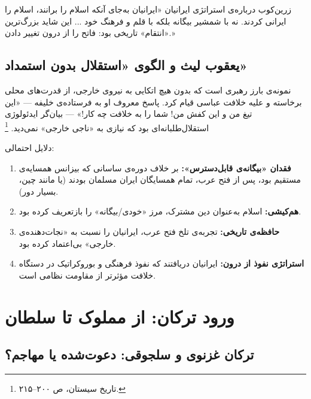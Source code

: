 \begin{histQuote}{زرین‌کوب درباره‌ی استراتژی ایرانیان}
«ایرانیان به‌جای آنکه اسلام را برانند، اسلام را ایرانی کردند. نه با شمشیر بیگانه بلکه با قلم و فرهنگ خود ... این شاید بزرگ‌ترین «انتقام» تاریخی بود: فاتح را از درون تغییر دادن.»
\end{histQuote}

\subsection{یعقوب لیث و الگوی «استقلال بدون استمداد»}
\label{subsec:ch05-yaqub}

 نمونه‌ی بارز رهبری است که بدون هیچ اتکایی به نیروی خارجی، از قدرت‌های محلی برخاسته و علیه خلافت عباسی قیام کرد. پاسخ معروف او به فرستاده‌ی خلیفه — «این تیغ من و این کفش من! شما را به خلافت چه کار!» — بیان‌گر ایدئولوژی استقلال‌طلبانه‌ای بود که نیازی به «ناجی خارجی» نمی‌دید.%
\footnote{تاریخ سیستان، ص ۲۰۰--۲۱۵.}

\begin{tcolorbox}[defbox, title={نکته‌ی تحلیلی: چرا ایرانیان دوره‌ی اسلامی کمتر از بیگانه یاری خواستند؟}]
دلایل احتمالی:
\begin{enumerate}[nosep, label=\textbf{\arabic*.}]
  \item \textbf{فقدان «بیگانه‌ی قابل‌دسترس»:} بر خلاف دوره‌ی ساسانی که بیزانس همسایه‌ی مستقیم بود، پس از فتح عرب، تمام همسایگان ایران مسلمان بودند (یا مانند چین، بسیار دور).
  \item \textbf{هم‌کیشی:} اسلام به‌عنوان دین مشترک، مرز «خودی/بیگانه» را بازتعریف کرده بود.
  \item \textbf{حافظه‌ی تاریخی:} تجربه‌ی تلخ فتح عرب، ایرانیان را نسبت به «نجات‌دهنده‌ی خارجی» بی‌اعتماد کرده بود.
  \item \textbf{استراتژی نفوذ از درون:} ایرانیان دریافتند که نفوذ فرهنگی و بوروکراتیک در دستگاه خلافت مؤثرتر از مقاومت نظامی است.
\end{enumerate}
\end{tcolorbox}

\section{ورود ترکان: از مملوک تا سلطان}
\label{sec:ch05-turks}

\subsection{ترکان غزنوی و سلجوقی: دعوت‌شده یا مهاجم؟}
\label{subsec:ch05-ghaznavid-seljuq}


